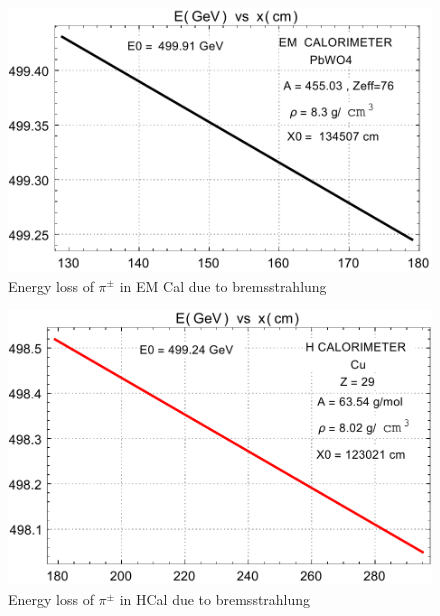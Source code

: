 \begin{figure}
    \centering
    \includegraphics[width=0.50\linewidth]{Experiment/CMS/Image/Loss/pion_ecal.pdf}
    \caption{Energy loss of $\pi^{\pm}$ in EM Cal due to bremsstrahlung}
    \label{fig:silicon}
\end{figure}

\begin{figure}
    \centering
    \includegraphics[width=0.50\linewidth]{Experiment/CMS/Image/Loss/pion_hcal.pdf}
    \caption{Energy loss of $\pi^{\pm}$ in HCal due to bremsstrahlung}
    \label{fig:silicon}
\end{figure}

